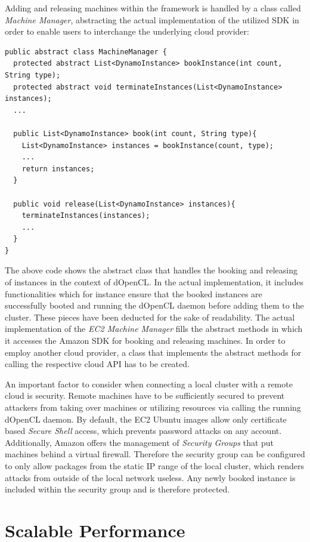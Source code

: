 Adding and releasing machines within the framework is handled by a class called \textit{Machine Manager}, abstracting the actual implementation of the utilized SDK in order to enable users to interchange the underlying cloud provider:


\begin{lstlisting}[caption=Machine Manager Abstract Implementation,captionpos=b]
public abstract class MachineManager {
  protected abstract List<DynamoInstance> bookInstance(int count, String type);
  protected abstract void terminateInstances(List<DynamoInstance> instances);
  ...

  public List<DynamoInstance> book(int count, String type){
    List<DynamoInstance> instances = bookInstance(count, type);
    ...
    return instances;
  }

  public void release(List<DynamoInstance> instances){
    terminateInstances(instances);
    ...
  }
}
\end{lstlisting}

The above code shows the abstract class that handles the booking and releasing of instances in the context of dOpenCL. In the actual implementation, it includes functionalities which for instance ensure that the booked instances are successfully booted and running the dOpenCL daemon before adding them to the cluster. These pieces have been deducted for the sake of readability. The actual implementation of the \textit{EC2 Machine Manager} fills the abstract methods in which it accesses the Amazon SDK for booking and releasing machines. In order to employ another cloud provider, a class that implements the abstract methods for calling the respective cloud API has to be created.

An important factor to consider when connecting a local cluster with a remote cloud is security. Remote machines have to be sufficiently secured to prevent attackers from taking over machines or utilizing resources via calling the running dOpenCL daemon. By default, the EC2 Ubuntu images allow only certificate based \textit{Secure Shell} access, which prevents password attacks on any account. Additionally, Amazon offers the management of \textit{Security Groups} that put machines behind a virtual firewall. Therefore the security group can be configured to only allow packages from the static IP range of the local cluster, which renders attacks from outside of the local network useless. Any newly booked instance is included within the security group and is therefore protected.

\section{Scalable Performance}
\label{scalable_performance}


